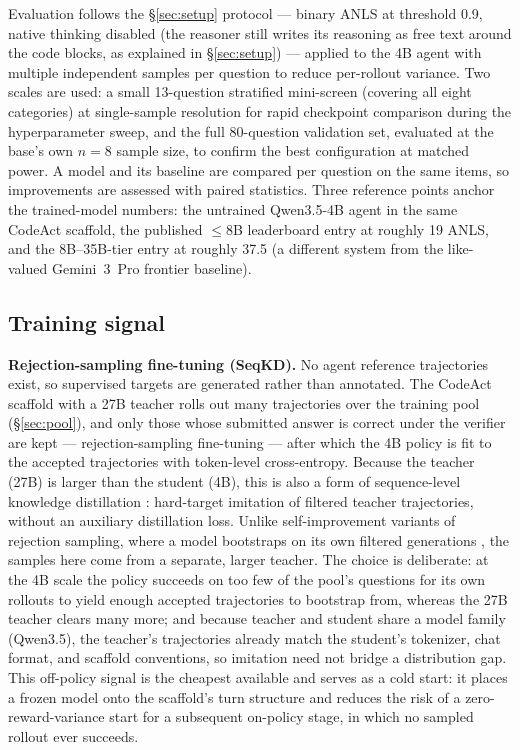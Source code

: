Evaluation follows the \S\ref{sec:setup} protocol --- binary ANLS at threshold 0.9, native thinking disabled (the reasoner still writes its reasoning as free text around the code blocks, as explained in \S\ref{sec:setup}) --- applied to the 4B agent with multiple independent samples per question to reduce per-rollout variance. Two scales are used: a small 13-question stratified mini-screen (covering all eight categories) at single-sample resolution for rapid checkpoint comparison during the hyperparameter sweep, and the full 80-question validation set, evaluated at the base's own $n{=}8$ sample size, to confirm the best configuration at matched power. A model and its baseline are compared per question on the same items, so improvements are assessed with paired statistics. Three reference points anchor the trained-model numbers: the untrained Qwen3.5-4B agent in the same CodeAct scaffold, the published $\leq$8B leaderboard entry at roughly 19 ANLS, and the 8B--35B-tier entry at roughly 37.5 (a different system from the like-valued Gemini~3~Pro frontier baseline).

\subsection{Training signal}

\textbf{Rejection-sampling fine-tuning (SeqKD).} No agent reference trajectories exist, so supervised targets are generated rather than annotated. The CodeAct scaffold with a 27B teacher rolls out many trajectories over the training pool (\S\ref{sec:pool}), and only those whose submitted answer is correct under the verifier are kept --- rejection-sampling fine-tuning \citep{rft} --- after which the 4B policy is fit to the accepted trajectories with token-level cross-entropy. Because the teacher (27B) is larger than the student (4B), this is also a form of sequence-level knowledge distillation \citep{seqkd}: hard-target imitation of filtered teacher trajectories, without an auxiliary distillation loss. Unlike self-improvement variants of rejection sampling, where a model bootstraps on its own filtered generations \citep{star,rest}, the samples here come from a separate, larger teacher. The choice is deliberate: at the 4B scale the policy succeeds on too few of the pool's questions for its own rollouts to yield enough accepted trajectories to bootstrap from, whereas the 27B teacher clears many more; and because teacher and student share a model family (Qwen3.5), the teacher's trajectories already match the student's tokenizer, chat format, and scaffold conventions, so imitation need not bridge a distribution gap. This off-policy signal is the cheapest available and serves as a cold start: it places a frozen model onto the scaffold's turn structure and reduces the risk of a zero-reward-variance start for a subsequent on-policy stage, in which no sampled rollout ever succeeds.

